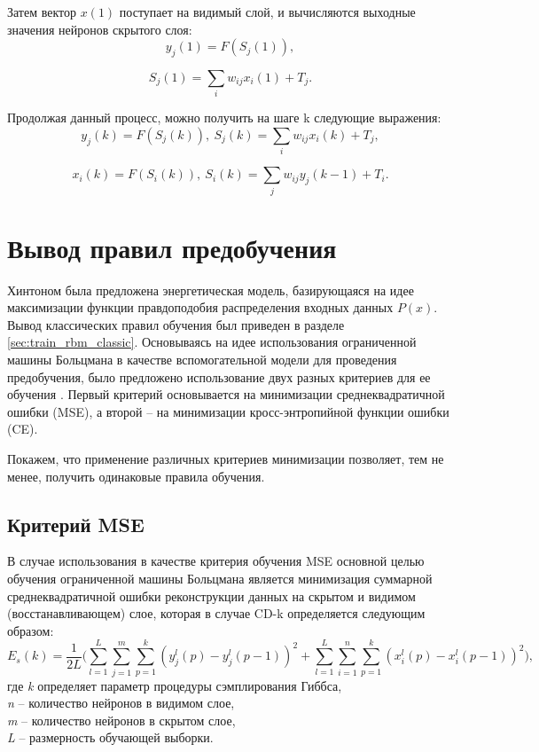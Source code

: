 Затем вектор $x(1)$ поступает на видимый слой, и вычисляются выходные значения нейронов скрытого слоя: 
\begin{equation}
    y_j(1)=F(S_j(1)),
\end{equation}

\begin{equation}
    S_j(1)=\sum_i w_{ij}x_i(1)+T_j.
\end{equation}

Продолжая данный процесс, можно получить на шаге k следующие выражения:
\begin{equation*}		
    y_j(k)=F(S_j(k)),\ S_j(k)=\sum_i w_{ij}x_i(k)+T_j,
\end{equation*}

\begin{equation*}		
    x_i(k)=F(S_i(k)),\ S_i(k)=\sum_j w_{ij}y_j(k-1)+T_i.
\end{equation*}

\section{Вывод правил предобучения} 

Хинтоном была предложена энергетическая модель, базирующаяся на идее максимизации функции правдоподобия распределения входных данных $P(x)$. Вывод классических правил обучения был приведен в разделе \ref{sec:train_rbm_classic}. Основываясь на идее использования ограниченной машины Больцмана в качестве вспомогательной модели для проведения предобучения, было предложено использование двух разных критериев для ее обучения \cite[c.~132-137]{4-A}. Первый критерий основывается на минимизации среднеквадратичной ошибки (MSE), а второй -- на минимизации кросс-энтропийной функции ошибки (CE).

Покажем, что применение различных критериев минимизации позволяет, тем не менее, получить одинаковые правила обучения.

\subsection{Критерий MSE}

В случае использования в качестве критерия обучения MSE основной целью обучения ограниченной машины Больцмана является минимизация суммарной среднеквадратичной ошибки реконструкции данных на скрытом и видимом (восстанавливающем) слое, которая в случае CD-k определяется следующим образом:	
\begin{equation*}	
    E_s(k)=\frac{1}{2L}\Bigg(\sum_{l=1}^L\sum_{j=1}^m\sum_{p=1}^k (y_j^l(p)-y_j^l(p-1))^2+\sum_{l=1}^L\sum_{i=1}^n\sum_{p=1}^k (x_i^l(p)-x_i^l(p-1))^2\Bigg),
\end{equation*}
где \textit{k} определяет параметр процедуры сэмплирования Гиббса,\\
\textit{n} -- количество нейронов в видимом слое,\\
\textit{m} -- количество нейронов в скрытом слое,\\
\textit{L} -- размерность обучающей выборки.

